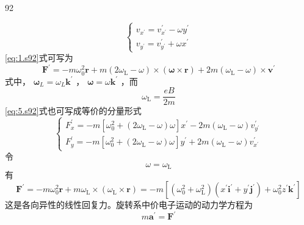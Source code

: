 \begin{solution}{92}
\begin{subsolution}
\begin{equation}
\left\{ \begin{array}{l} v _ {x ^ {\prime}} = v _ {x ^ {\prime}} ^ {\prime} - \omega y ^ {\prime} \\ v _ {y ^ {\prime}} = v _ {y ^ {\prime}} ^ {\prime} + \omega x ^ {\prime} \end{array} \right.
\label{eq:4.s92}
\end{equation}
\eqref{eq:1.s92}式可写为
\begin{equation}
\boldsymbol {F} ^ {\prime} = - m \omega_ {0} ^ {2} \boldsymbol {r} + m (2 \omega_ {\mathrm{L}} - \omega) \times (\boldsymbol {\omega} \times \boldsymbol {r}) + 2 m (\omega_ {\mathrm{L}} - \omega) \times \boldsymbol {v} ^ {\prime}
\label{eq:5.s92}
\end{equation}
式中， $\boldsymbol{\omega}_{L}=\omega_{L}\boldsymbol{k}^{\prime}$ ， $\boldsymbol{\omega}=\omega \boldsymbol{k}^{\prime}$ ，而
\begin{equation}
\omega_ {\mathrm{L}} = \frac {e B}{2 m}
\label{eq:6.s92}
\end{equation}
\eqref{eq:5.s92}式也可写成等价的分量形式
\begin{equation}
\left\{ \begin{array}{l} F _ {x} ^ {\prime} = - m \left[ \omega_ {0} ^ {2} + (2 \omega_ {\mathrm{L}} - \omega) \omega \right] x ^ {\prime} - 2 m (\omega_ {\mathrm{L}} - \omega) v _ {y ^ {\prime}} ^ {\prime} \\ F _ {y} ^ {\prime} = - m \left[ \omega_ {0} ^ {2} + (2 \omega_ {\mathrm{L}} - \omega) \omega \right] y ^ {\prime} + 2 m (\omega_ {\mathrm{L}} - \omega) v _ {x ^ {\prime}} ^ {\prime} \end{array} \right.
\label{eq:7.s92}
\end{equation}
令
\begin{equation}
\omega = \omega_ {\mathrm{L}}
\label{eq:8.s92}
\end{equation}
有
\begin{equation}
\boldsymbol {F} ^ {\prime} = - m \omega_ {0} ^ {2} \boldsymbol {r} + m \omega_ {\mathrm{L}} \times (\omega_ {\mathrm{L}} \times \boldsymbol {r}) = - m \left[ \left(\omega_ {0} ^ {2} + \omega_ {\mathrm{L}} ^ {2}\right) \left(x ^ {\prime} \boldsymbol {i} ^ {\prime} + y ^ {\prime} \boldsymbol {j} ^ {\prime}\right) + \omega_ {0} ^ {2} z ^ {\prime} \boldsymbol {k} ^ {\prime} \right]
\label{eq:9.s92}
\end{equation}
这是各向异性的线性回复力。旋转系中价电子运动的动力学方程为
\begin{equation}
m \boldsymbol {a} ^ {\prime} = \boldsymbol {F} ^ {\prime}

\end{equation}
\end{subsolution}
\end{solution}
